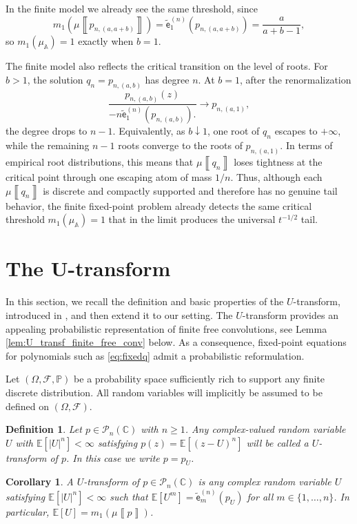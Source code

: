 \documentclass[a4paper,11pt]{amsart}
\numberwithin{equation}{section}
\newtheorem{corollary}[theorem]{Corollary}
\newtheorem{definition}[theorem]{Definition}
\newcommand{\C}{\mathbb{C}}
\newcommand{\E}{\mathbb{E}}
\renewcommand{\P}{\mathbb{P}}
\newcommand{\pols}{\mathcal P}
\def \A {{\mathbb A}}
\newcommand{\meas}[1]{\mu\! \left\llbracket #1 \right\rrbracket}
\newcommand{\coef}[2]{\widetilde{\mathsf{e}}_{#1}^{(#2)}} %
\begin{document}
In the finite model we already see the same threshold, since
\[
m_1\left(\meas{p_{n,(a,a+b)}}\right)
=
\coef{1}{n}\!\left(p_{n,(a,a+b)}\right)
=
\frac{a}{a+b-1},
\]
so \(m_1(\mu_\A)=1\) exactly when \(b=1\).

The finite model also reflects the critical transition on the level of roots. For \(b>1\), the solution \(q_n=p_{n,(a,b)}\) has degree \(n\). At \(b=1\), after the renormalization
\[
\frac{
p_{n,(a,b)}(z)
}{
-n\coef{1}{n}(p_{n,(a,b)}).
}\to p_{n,(a,1)},
\]
the degree drops to \(n-1\). Equivalently, as \(b\downarrow1\), one root of \(q_n\) escapes to \(+\infty\), while the remaining \(n-1\) roots converge to the roots of \(p_{n,(a,1)}\). In terms of empirical root distributions, this means that \(\meas{q_n}\) loses tightness at the critical point through one escaping atom of mass \(1/n\). Thus, although each \(\meas{q_n}\) is discrete and compactly supported and therefore has no genuine tail behavior, the finite fixed-point problem already detects the same critical threshold \(m_1(\mu_\A)=1\) that in the limit produces the universal \(t^{-1/2}\) tail.





\section{The U-transform}\label{sec:U}

In this section, we recall the definition and basic properties of the $U$-transform, introduced in \cite{Mar21}, and then extend it to our setting. The 
$U$-transform provides an appealing probabilistic representation of finite free convolutions, see Lemma \ref{lem:U_transf_finite_free_conv} below. As a consequence, fixed-point equations for polynomials such as \eqref{eq:fixedq} admit a probabilistic reformulation.

Let $(\Omega, \mathcal{F},\P)$ be a probability space sufficiently rich to support any finite discrete distribution.  All random variables will implicitly be assumed to be defined on $(\Omega, \mathcal{F})$. 

\begin{definition}
Let $p\in\pols_n(\C)$ with $n\ge1$. Any complex-valued random variable $U$ with $\E[|U|^n]<\infty$ satisfying $p(z) = \E[(z-U)^n]$ will be called a $U$-transform of $p$. In this case we write $p= p_U$. 
\end{definition}



\begin{corollary}\label{cor:E[U^m]}
A $U$-transform of $p\in\pols_n(\C)$ is any complex random variable $U$ satisfying $\E[|U|^n]<\infty$ such that   $\E[U^m]=\coef{m}{n}(p_U)$ for all $m\in\{1,\dots,n\}$. In particular, $\E[U]=m_1(\meas{p})$.
\end{corollary}
\end{document}

